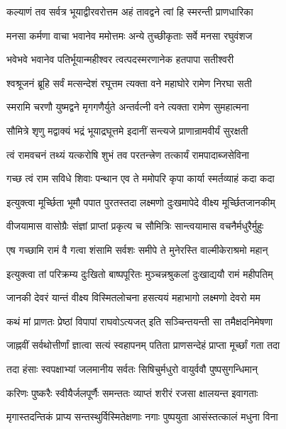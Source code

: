 \twolineshloka
{कल्याणं तव सर्वत्र भूयाद्वीरवरोत्तम}
{अहं तावद्वने त्वां हि स्मरन्ती प्राणधारिका}%

\twolineshloka
{मनसा कर्मणा वाचा भवानेव ममोत्तमः}
{अन्ये तुच्छीकृताः सर्वे मनसा रघुवंशज}%

\twolineshloka
{भवेभवे भवानेव पतिर्भूयान्महीश्वर}
{त्वत्पदस्मरणानेक हतपापा सतीश्वरी}%

\twolineshloka
{श्वश्रूजनं ब्रूहि सर्वं मत्सन्देशं रघूत्तम}
{त्यक्ता वने महाघोरे रामेण निरघा सती}%

\twolineshloka
{स्मरामि चरणौ युष्मद्वने मृगगणैर्युते}
{अन्तर्वत्नी वने त्यक्ता रामेण सुमहात्मना}%

\twolineshloka
{सौमित्रे शृणु मद्वाक्यं भद्रं भूयाद्रघूत्तमे}
{इदानीं सन्त्यजे प्राणान्रामवीर्यं सुरक्षती}%

\twolineshloka
{त्वं रामवचनं तथ्यं यत्करोषि शुभं तव}
{परतन्त्त्रेण तत्कार्यं रामपादाब्जसेविना}%

\twolineshloka
{गच्छ त्वं राम सविधे शिवाः पन्थान एव ते}
{ममोपरि कृपा कार्या स्मर्तव्याहं कदा कदा}%

\twolineshloka
{इत्युक्त्वा मूर्च्छिता भूमौ पपात पुरतस्तदा}
{लक्ष्मणो दुःखमापेदे वीक्ष्य मूर्च्छितजानकीम्}%

\twolineshloka
{वीजयामास वासोग्रैः संज्ञां प्राप्तां प्रकृत्य च}
{सौमित्रिः सान्त्वयामास वचनैर्मधुरैर्मुहुः}%


\twolineshloka
{एष गच्छामि रामं वै गत्वा शंसामि सर्वशः}
{समीपे ते मुनेरस्ति वाल्मीकेराश्रमो महान्}%

\twolineshloka
{इत्युक्त्वा तां परिक्रम्य दुःखितो बाष्पपूरितः}
{मुञ्चन्नश्रुकलां दुःखाद्ययौ रामं महीपतिम्}%

\twolineshloka
{जानकी देवरं यान्तं वीक्ष्य विस्मितलोचना}
{हसत्ययं महाभागो लक्ष्मणो देवरो मम}%

\twolineshloka
{कथं मां प्राणतः प्रेष्ठां विपापां राघवोऽत्यजत्}
{इति सञ्चिन्तयन्ती सा तमैक्षदनिमेषणा}%

\twolineshloka
{जाह्नवीं सर्वथोत्तीर्णां ज्ञात्वा सत्यं स्वहापनम्}
{पतिता प्राणसन्देहं प्राप्ता मूर्च्छां गता तदा}%

\twolineshloka
{तदा हंसाः स्वपक्षाभ्यां जलमानीय सर्वतः}
{सिषिचुर्मधुरो वायुर्ववौ पुष्पसुगन्धिमान्}%

\twolineshloka
{करिणः पुष्करैः स्वीयैर्जलपूर्णैः समन्ततः}
{व्याप्तं शरीरं रजसा क्षालयन्त इवागताः}%

\twolineshloka
{मृगास्तदन्तिकं प्राप्य सन्तस्थुर्विस्मितेक्षणाः}
{नगाः पुष्पयुता आसंस्तत्कालं मधुना विना}%

